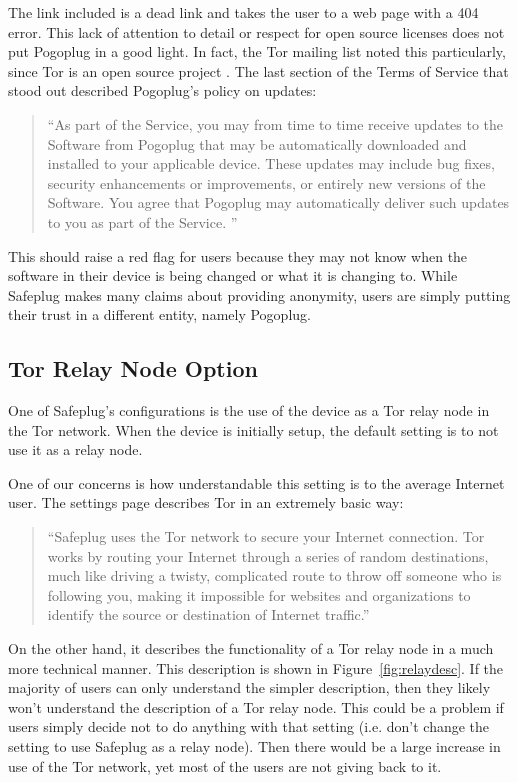 The link included is a dead link and takes the user to a web page with a 404 error.  This lack of attention to detail or respect for open source licenses does not put Pogoplug in a good light.  In fact, the Tor mailing list noted this particularly, since Tor is an open source project \cite{tormailinglist}.  The last section of the Terms of Service that stood out described Pogoplug's policy on updates:

\begin{quotation}
``As part of the Service, you may from time to time receive updates to the Software from Pogoplug that may be automatically downloaded and installed to your applicable device. These updates may include bug fixes, security enhancements or improvements, or entirely new versions of the Software. You agree that Pogoplug may automatically deliver such updates to you as part of the Service. '' \cite{safeplug}
\end{quotation}

This should raise a red flag for users because they may not know when the software in their device is being changed or what it is changing to.  While Safeplug makes many claims about providing anonymity, users are simply putting their trust in a different entity, namely Pogoplug.

\subsection{Tor Relay Node Option}
One of Safeplug's configurations is the use of the device as a Tor relay node in the Tor network.  When the device is initially setup, the default setting is to not use it as a relay node.  

One of our concerns is how understandable this setting is to the average Internet user.  The settings page describes Tor in an extremely basic way:

\begin{quotation}
``Safeplug uses the Tor network to secure your Internet connection.  Tor works by routing your Internet through a series of random destinations, much like driving a twisty, complicated route to throw off someone who is following you, making it impossible for websites and organizations to identify the source or destination of Internet traffic.'' \cite{safeplug}
\end{quotation}

On the other hand, it describes the functionality of a Tor relay node in a much more technical manner.  This description is shown in Figure~\ref{fig:relaydesc}.  If the majority of users can only understand the simpler description, then they likely won't understand the description of a Tor relay node.  This could be a problem if users simply decide not to do anything with that setting (i.e. don't change the setting to use Safeplug as a relay node).  Then there would be a large increase in use of the Tor network, yet most of the users are not giving back to it.

